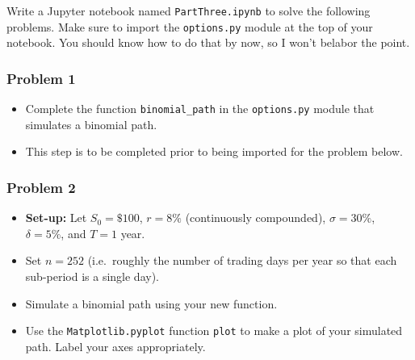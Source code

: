 \documentclass[
]{article}
\providecommand{\tightlist}{%
  \setlength{\itemsep}{0pt}\setlength{\parskip}{0pt}}
\begin{document}
Write a Jupyter notebook named \texttt{PartThree.ipynb} to solve the
following problems. Make sure to import the \texttt{options.py} module
at the top of your notebook. You should know how to do that by now, so I
won't belabor the point.

\hypertarget{problem-1-2}{%
\subsubsection{\texorpdfstring{\textbf{Problem
1}}{Problem 1}}\label{problem-1-2}}

\begin{itemize}
\tightlist
\item
  Complete the function \texttt{binomial\_path} in the
  \texttt{options.py} module that simulates a binomial path.
\item
  This step is to be completed prior to being imported for the problem
  below.
\end{itemize}

\hypertarget{problem-2-2}{%
\subsubsection{\texorpdfstring{\textbf{Problem
2}}{Problem 2}}\label{problem-2-2}}

\begin{itemize}
\tightlist
\item
  \textbf{Set-up:} Let \(S_{0} = \$100\), \(r = 8\%\) (continuously
  compounded), \(\sigma = 30\%\), \(\delta = 5\%\), and \(T = 1\) year.
\item
  Set \(n = 252\) (i.e.~roughly the number of trading days per year so
  that each sub-period is a single day).
\item
  Simulate a binomial path using your new function.
\item
  Use the \texttt{Matplotlib.pyplot} function \texttt{plot} to make a
  plot of your simulated path. Label your axes appropriately.
\end{itemize}
\end{document}

